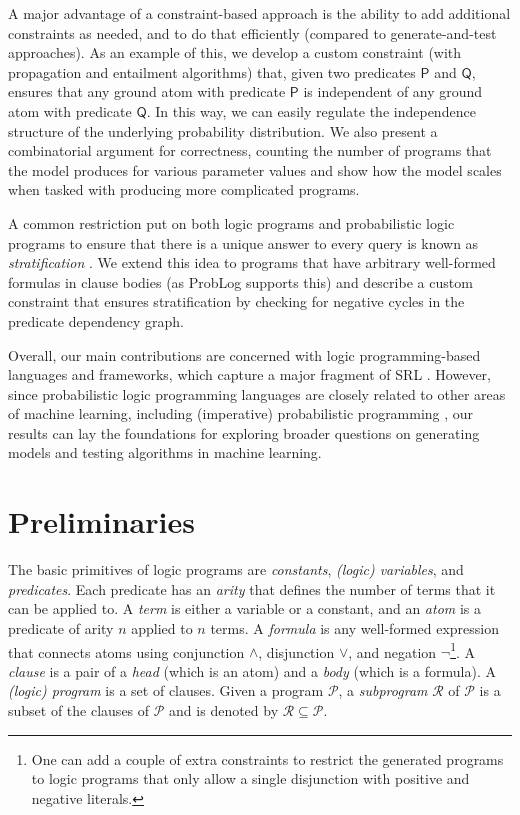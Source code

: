 \documentclass[runningheads]{llncs}
\begin{document}
A major advantage of a constraint-based approach is the ability to add
additional constraints as needed, and to do that efficiently (compared to
generate-and-test approaches). As an example of this, we develop a custom
constraint (with propagation and entailment algorithms) that, given two
predicates $\mathsf{P}$ and $\mathsf{Q}$, ensures that any ground atom with
predicate $\mathsf{P}$ is independent of any ground atom with predicate
$\mathsf{Q}$. In this way, we can easily regulate the independence structure of
the underlying probability distribution. We also present a combinatorial
argument for correctness, counting the number of programs that the model
produces for various parameter values and show how the model scales when tasked
with producing more complicated programs.

A common restriction put on both logic programs and probabilistic logic programs
to ensure that there is a unique answer to every query is known as
\emph{stratification}
\cite{DBLP:journals/jlp/BalbinPRM91,DBLP:conf/padl/MantadelisR17}. We extend
this idea to programs that have arbitrary well-formed formulas in clause bodies
(as ProbLog supports this) and describe a custom constraint that ensures
stratification by checking for negative cycles in the predicate dependency
graph.

Overall, our main contributions are concerned with logic programming-based
languages and frameworks, which capture a major fragment of SRL
\cite{DBLP:series/synthesis/2016Raedt}. However, since probabilistic logic
programming languages are closely related to other areas of machine learning,
including (imperative) probabilistic programming
\cite{DBLP:journals/ml/RaedtK15}, our results can lay the foundations for
exploring broader questions on generating models and testing algorithms in
machine learning.

\section{Preliminaries}

The basic primitives of logic programs are \emph{constants}, \emph{(logic)
  variables}, and \emph{predicates}. Each predicate has an \emph{arity} that
defines the number of terms that it can be applied to. A \emph{term} is either a
variable or a constant, and an \emph{atom} is a predicate of arity $n$ applied
to $n$ terms. A \emph{formula} is any well-formed expression that connects
atoms using conjunction $\land$, disjunction $\lor$, and negation
$\neg$\footnote{One can add a couple of extra constraints to restrict the
  generated programs to logic programs that only allow a single disjunction with
  positive and negative literals.}.
A \emph{clause} is a pair of a \emph{head} (which is an atom) and a \emph{body}
(which is a formula). A \emph{(logic) program} is a set of clauses. Given a
program $\mathscr{P}$, a \emph{subprogram} $\mathscr{R}$ of $\mathscr{P}$ is a
subset of the clauses of $\mathscr{P}$ and is denoted by $\mathscr{R} \subseteq
\mathscr{P}$.
\end{document}
